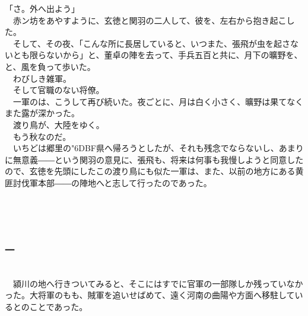 \documentclass[
  paper=a5,
  fontsize=10pt,
  jafontsize=9.5pt,
  tate,                  %
  open_bracket_pos=nibu, %
]{jlreq}
\begin{document}
「さ。外へ出よう」\\


　赤ン坊をあやすように、玄徳と関羽の二人して、彼を、左右から抱き起こした。\\


　そして、その夜、「こんな所に長居していると、いつまた、張飛が虫を起さないとも限らないから」と、董卓の陣を去って、手兵五百と共に、月下の曠野を、と、風を負って歩いた。\\


　わびしき雑軍。\\


　そして官職のない将僚。\\


　一軍のは、こうして再び続いた。夜ごとに、月は白く小さく、曠野は果てなくまた露が深かった。\\


　渡り鳥が、大陸をゆく。\\


　もう秋なのだ。\\


　いちどは郷里の{\char"6DBF}県へ帰ろうとしたが、それも残念でならないし、あまりに無意義――という関羽の意見に、張飛も、将来は何事も我慢しようと同意したので、玄徳を先頭にしたこの渡り鳥にも似た一軍は、また、以前の地方にある黄匪討伐軍本部――の陣地へと志して行ったのであった。\\

\\

\subsection{}

\\

\subsubsection{一}

\\


　潁川の地へ行きついてみると、そこにはすでに官軍の一部隊しか残っていなかった。大将軍のもも、賊軍を追いせばめて、遠く河南の曲陽や方面へ移駐しているとのことであった。\\
\end{document}

